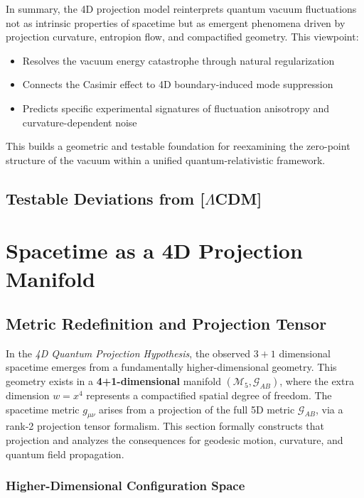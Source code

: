 \documentclass[12pt]{article}
\begin{document}
In summary, the 4D projection model reinterprets quantum vacuum fluctuations not as intrinsic properties of spacetime but as emergent phenomena driven by projection curvature, entropion flow, and compactified geometry. This viewpoint:
\begin{itemize}
    \item Resolves the vacuum energy catastrophe through natural regularization
    \item Connects the Casimir effect to 4D boundary-induced mode suppression
    \item Predicts specific experimental signatures of fluctuation anisotropy and curvature-dependent noise
\end{itemize}

This builds a geometric and testable foundation for reexamining the zero-point structure of the vacuum within a unified quantum-relativistic framework.
\subsection{Testable Deviations from [$\Lambda$CDM]}

\section{Spacetime as a 4D Projection Manifold}
\subsection{Metric Redefinition and Projection Tensor}
\label{subsec:metric_projection_tensor}

In the \emph{4D Quantum Projection Hypothesis}, the observed \(3+1\) dimensional spacetime emerges from a fundamentally higher-dimensional geometry. This geometry exists in a \textbf{4+1-dimensional} manifold \((\mathcal{M}_5, \mathcal{G}_{AB})\), where the extra dimension \(w = x^4\) represents a compactified spatial degree of freedom. The spacetime metric \(g_{\mu\nu}\) arises from a projection of the full 5D metric \(\mathcal{G}_{AB}\), via a rank-2 projection tensor formalism. This section formally constructs that projection and analyzes the consequences for geodesic motion, curvature, and quantum field propagation.

\subsubsection*{Higher-Dimensional Configuration Space}
\end{document}
